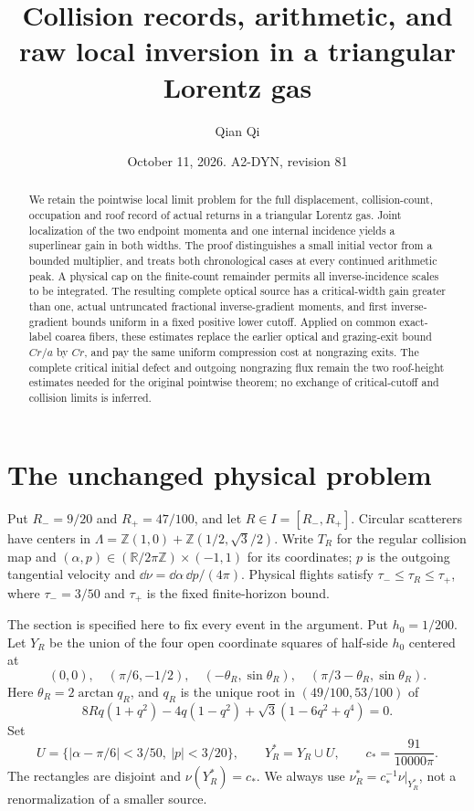 \documentclass[11pt,reqno]{amsart}
\title[Collision records and raw local inversion]{Collision records, arithmetic, and raw local inversion in a triangular Lorentz gas}
\author{Qian Qi}
\date{October 11, 2026. A2-DYN, revision 81}
\numberwithin{equation}{section}
\theoremstyle{definition}
\theoremstyle{remark}\newtheorem{remark}[theorem]{Remark}
\newcommand{\R}{\mathbb R}\newcommand{\Z}{\mathbb Z}
\begin{document}
\raggedbottom
\begin{abstract}
We retain the pointwise local limit problem for the full displacement,
collision-count, occupation and roof record of actual returns in a
triangular Lorentz gas. Joint localization of the two endpoint momenta
and one internal incidence yields a superlinear gain in both widths.
The proof distinguishes a small initial vector from a bounded
multiplier, and treats both chronological cases at every continued
arithmetic peak. A physical cap on the finite-count remainder permits
all inverse-incidence scales to be integrated. The resulting complete
optical source has a critical-width gain greater than one, actual
untruncated fractional inverse-gradient moments, and first
inverse-gradient bounds uniform in a fixed positive lower cutoff.
Applied on common exact-label coarea fibers, these estimates replace
the earlier optical and grazing-exit bound $Cr/a$ by $Cr$, and pay
the same uniform compression cost at nongrazing exits. The complete
critical initial defect and outgoing nongrazing flux remain the two
roof-height estimates needed for the original pointwise theorem;
no exchange of critical-cutoff and collision limits is inferred.
\end{abstract}
\maketitle

\section{The unchanged physical problem}
Put $R_-=9/20$ and $R_+=47/100$, and let $R\in I=[R_-,R_+]$. Circular scatterers have centers in
$\Lambda=\Z(1,0)+\Z(1/2,\sqrt3/2)$. Write $T_R$ for the regular
collision map and $(\alpha,p)\in(\R/2\pi\Z)\times(-1,1)$ for its
coordinates; $p$ is the outgoing tangential velocity and
$\dd\nu=\dd\alpha\,\dd p/(4\pi)$. Physical flights satisfy
$\tau_-\le\tau_R\le\tau_+$, where $\tau_-=3/50$ and $\tau_+$
is the fixed finite-horizon bound.

The section is specified here to fix every event in the argument.
Put $h_0=1/200$. Let $Y_R$ be the union of the four open coordinate
squares of half-side $h_0$ centered at
\[
 (0,0),\quad(\pi/6,-1/2),\quad
 (-\theta_R,\sin\theta_R),\quad
 (\pi/3-\theta_R,\sin\theta_R).
\]
Here $\theta_R=2\arctan q_R$, and $q_R$ is the unique root in
$(49/100,53/100)$ of
\[
 8Rq(1+q^2)-4q(1-q^2)+\sqrt3(1-6q^2+q^4)=0.
\]
Set
\[
 U=\{|\alpha-\pi/6|<3/50,\ |p|<3/20\},\qquad
 Y_R^*=Y_R\cup U,\qquad c_*=\frac{91}{10000\pi}.
\]
The rectangles are disjoint and $\nu(Y_R^*)=c_*$. We always use
$\nu_R^*=c_*^{-1}\nu|_{Y_R^*}$, not a renormalization of a smaller
source.
\end{document}

